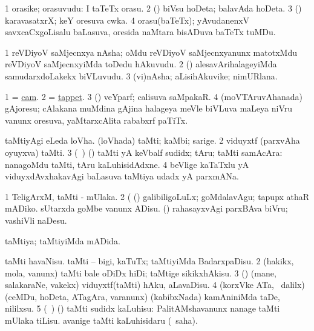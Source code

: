 \bentry
{}
\gl{\nA}
\bmng
\bnum
\num{1} orasike; orasuvudu:  I taTeTx orasu. 
\num{2} (\ashi) biVsu hoDeta; balavAda hoDeta. 
\num{3} (\ashi) karavasatxrX; keY oresuva cwka. 
\num{4} orasu(baTeTx); yAvudanenxV savxcaCxgoLisalu baLasuva, oresida naMtara bisADuva baTeTx tuMDu. 
\enum
\emng
\eentry

\bentry
{}
\gl{\nA}
\bmng
\bnum
\num{1} reVDiyoV saMjecnxya nAsha; oMdu reVDiyoV saMjecnxyanunx matotxMdu reVDiyoV saMjecnxyiMda toDedu hAkuvudu. 
\num{2} (\ashi) alesavArihalageyiMda  samudarxdoLakekx biVLuvudu. 
\num{3} (vi)nAsha; aLisihAkuvike; nimURlana. 
\enum
\emng
\eentry

\bentry
{}
\gl{\nA}
\bmng
\bnum
\num{1} = \hyperref{kandict_c.pdf}{C}{cam}{cam}. 
\num{2} = \hyperref{kandict_t.pdf}{T}{tappet}{tappet}. 
\num{3} (\viduyx) veYparf; calisuva saMpakaR. 
\num{4} (moVTAruvAhanada) gAjoresu; cAlakana muMdina gAjina halageya meVle biVLuva maLeya niVru \mo vanunx oresuva, yaMtarxcAlita rababxrf paTiTx. 
\enum
\emng
\eentry

\bentry
{}
\gl{\saMkiSx}
\bmng
{} 
\emng
\eentry

\bentry
{} 
\gl{\nA}
\expl{}
\bmng
\bnum
{} 
\banum
{} taMtiyAgi eLeda loVha. 
 (loVhada) taMti; kaMbi; sarige. 
\eanum
\numie
\num{2} viduyxtf (parxvAha oyuyxva) taMti. 
\num{3} (\kanmu\ \ame) (\AmA) taMti yA keVbalf sudidx; tAru; taMti samAcAra:  nanagoMdu taMti, tAru kaLuhisidAdxne. 
\num{4} beVlige kaTaTxlu yA viduyxdAvxhakavAgi baLasuva taMtiya udadx yA parxmANa. 
\enum
\emng

\noindent
\gl{\pagu}
\bmng
\bnum
\num{1}  TeligArxM, taMti - mUlaka. 
\num{2}  (  (\rUpa) galibiligoLuLx; goMdalavAgu; tapupx athaR mADiko. 
  
\banum
{} sUtarxda goMbe \mo vanunx ADisu. 
 (\rUpa) rahasayxvAgi parxBAva biVru; vashiVli naDesu. 
\eanum
\numie
\enum
\emng
\eentry

\bentry
{} 
\gl{\gu}
\bmng
taMtiya; taMtiyiMda mADida. 
\emng
\eentry

\bentry
{} 
\gl{\sakirx}
\bmng
\bnum
{} 
\banum
{} taMti havaNisu. 
 taMti -- bigi, kaTuTx; taMtiyiMda BadarxpaDisu. 
\eanum
\numie
\num{2} (hakikx, mola, \mo vanunx) taMti bale oDiDx hiDi; taMtige sikikxhAkisu. 
\num{3} (\viduyx) (mane, salakaraNe, \mo vakekx) viduyxtf(taMti) hAku, aLavaDisu. 
\num{4} (korxVke ATa, \sA\, \BUkaq dalilx) (ceMDu, hoDeta, ATagAra, \mo varanunx) (kabibxNada) kamAniniMda taDe, nililxsu. 
\num{5} (\kanmu\ \ame) (\AmA) taMti sudidx kaLuhisu:  PalitAMshavanunx nanage taMti mUlaka tiLisu.  avanige taMti kaLuhisidaru (\akirx\ saha). 
\enum
\emng
\eentry

